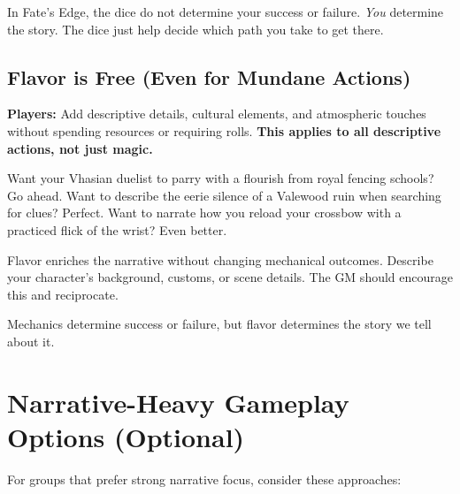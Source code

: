 \begin{tcolorbox}[colback=black!3!white, colframe=black!40!white, title=Remember, fonttitle=\bfseries,breakable]
In Fate's Edge, the dice do not determine your success or failure. \textit{You} determine the story. The dice just help decide which path you take to get there.
\end{tcolorbox}

\subsection{Flavor is Free (Even for Mundane Actions)}

\begin{tcolorbox}[colback=gray!5!white, colframe=gray!75!black, title=Flavor is Free, fonttitle=\bfseries,breakable]

\textbf{Players:} Add descriptive details, cultural elements, and atmospheric touches without spending resources or requiring rolls. \textbf{This applies to all descriptive actions, not just magic.}

Want your Vhasian duelist to parry with a flourish from royal fencing schools? Go ahead. Want to describe the eerie silence of a Valewood ruin when searching for clues? Perfect. Want to narrate how you reload your crossbow with a practiced flick of the wrist? Even better.

Flavor enriches the narrative without changing mechanical outcomes. Describe your character's background, customs, or scene details. The GM should encourage this and reciprocate.

Mechanics determine success or failure, but flavor determines the story we tell about it.
\end{tcolorbox}

\section*{Narrative-Heavy Gameplay Options (Optional)}

For groups that prefer strong narrative focus, consider these approaches:

